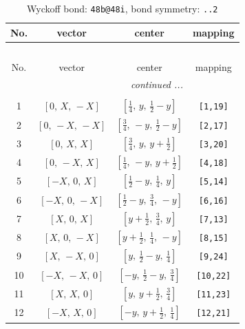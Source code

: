 \documentclass[fleqn,8pt]{jsarticle}
\begin{document}
\begin{longtable}{cccc}
\caption{Wyckoff bond: {\tt 48b@48i}, bond symmetry: {\tt ..2}}
 \\
 \hline \hline
No. & vector & center & mapping \\ \hline \endfirsthead

\multicolumn{3}{l}{\tablename\ \thetable{}} \\
 \hline \hline
No. & vector & center & mapping \\ \hline \endhead

 \hline \hline
\multicolumn{3}{r}{\footnotesize\it continued ...} \\ \endfoot

 \hline \hline
\multicolumn{3}{r}{} \\ \endlastfoot

1 & $\left[ 0,\, X,\, - X \right]$ & $\left[ \frac{1}{4},\, y,\, \frac{1}{2} - y \right]$ & {\tt [1,19]} \\ \hline
2 & $\left[ 0,\, - X,\, - X \right]$ & $\left[ \frac{3}{4},\, - y,\, \frac{1}{2} - y \right]$ & {\tt [2,17]} \\ \hline
3 & $\left[ 0,\, X,\, X \right]$ & $\left[ \frac{3}{4},\, y,\, y + \frac{1}{2} \right]$ & {\tt [3,20]} \\ \hline
4 & $\left[ 0,\, - X,\, X \right]$ & $\left[ \frac{1}{4},\, - y,\, y + \frac{1}{2} \right]$ & {\tt [4,18]} \\ \hline
5 & $\left[ - X,\, 0,\, X \right]$ & $\left[ \frac{1}{2} - y,\, \frac{1}{4},\, y \right]$ & {\tt [5,14]} \\ \hline
6 & $\left[ - X,\, 0,\, - X \right]$ & $\left[ \frac{1}{2} - y,\, \frac{3}{4},\, - y \right]$ & {\tt [6,16]} \\ \hline
7 & $\left[ X,\, 0,\, X \right]$ & $\left[ y + \frac{1}{2},\, \frac{3}{4},\, y \right]$ & {\tt [7,13]} \\ \hline
8 & $\left[ X,\, 0,\, - X \right]$ & $\left[ y + \frac{1}{2},\, \frac{1}{4},\, - y \right]$ & {\tt [8,15]} \\ \hline
9 & $\left[ X,\, - X,\, 0 \right]$ & $\left[ y,\, \frac{1}{2} - y,\, \frac{1}{4} \right]$ & {\tt [9,24]} \\ \hline
10 & $\left[ - X,\, - X,\, 0 \right]$ & $\left[ - y,\, \frac{1}{2} - y,\, \frac{3}{4} \right]$ & {\tt [10,22]} \\ \hline
11 & $\left[ X,\, X,\, 0 \right]$ & $\left[ y,\, y + \frac{1}{2},\, \frac{3}{4} \right]$ & {\tt [11,23]} \\ \hline
12 & $\left[ - X,\, X,\, 0 \right]$ & $\left[ - y,\, y + \frac{1}{2},\, \frac{1}{4} \right]$ & {\tt [12,21]} \\ \hline

\end{longtable}
\end{document}
